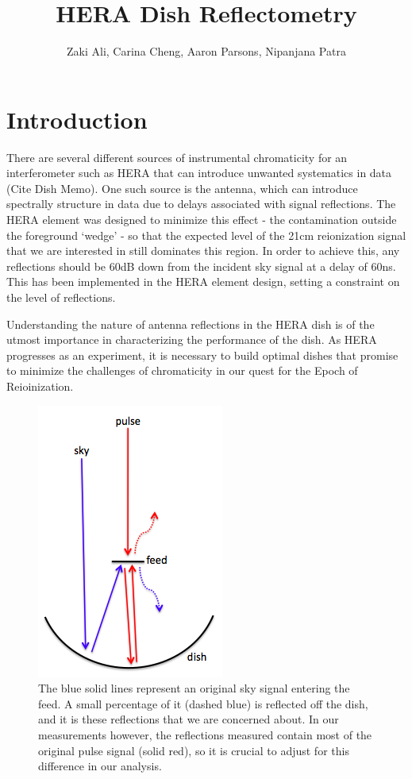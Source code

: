 \documentclass[12pt,preprint]{aastex}
\begin{document}
\title{HERA Dish Reflectometry} 
\author{Zaki Ali, Carina Cheng, Aaron Parsons, Nipanjana Patra}
\maketitle

\section{Introduction}

There are several different sources of instrumental chromaticity for an
interferometer such as HERA that can introduce unwanted systematics in data
(Cite Dish Memo). One such source is the antenna, which can introduce
spectrally structure in data due to delays associated with signal reflections.
The HERA element was designed to minimize this effect - the contamination
outside the foreground `wedge' - so that the expected level of the 21cm
reionization signal that we are interested in still dominates this region. In
order to achieve this, any reflections should be 60dB down from the incident
sky signal  at a delay of 60ns. This has been implemented in the HERA element
design, setting a constraint on the level of reflections. 

Understanding the nature of antenna reflections in the HERA dish is of the
utmost importance in characterizing the performance of the dish. As HERA
progresses as an experiment, it is necessary to build optimal dishes that
promise to minimize the challenges of chromaticity in our quest for the Epoch
of Reioinization.

\begin{figure}
\centering
\includegraphics[totalheight=0.3\textheight]{plots/reflection_cartoon.png}
\caption{The blue solid lines represent an original sky signal entering the feed. A small percentage of it (dashed blue) is reflected off the dish, and it is these reflections that we are concerned about. In our measurements however, the reflections measured contain most of the original pulse signal (solid red), so it is crucial to adjust for this difference in our analysis.}
\label{fig:cartoon}
\end{figure}
\end{document}
